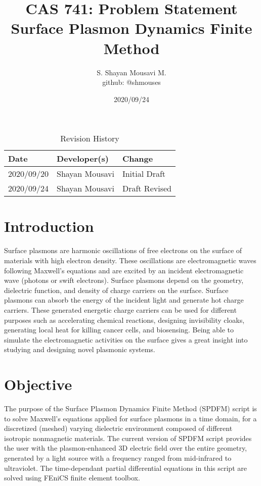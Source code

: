 \documentclass{article} \usepackage{tabularx} \usepackage{booktabs}
\title{CAS 741: Problem Statement\\Surface Plasmon Dynamics Finite Method}
\author{S. Shayan Mousavi M.\\github: @shmouses}
\date{2020/09/24}
\begin{document}
	
	\maketitle \clearpage
	
	
	\begin{table}[hp] \caption{Revision History} \label{TblRevisionHistory}
		\begin{tabularx}{\textwidth}{llX} \toprule \textbf{Date} &
			\textbf{Developer(s)} & \textbf{Change}\\ \midrule 2020/09/20 & Shayan Mousavi
			& Initial Draft\\ 2020/09/24 & Shayan Mousavi & Draft Revised\\ \bottomrule
	\end{tabularx} \end{table}
	
	
	
	\clearpage
	
	
	\newpage
	
	
	\newcommand*\apos{\textsc{\char13}} \section{Introduction}
	
	Surface plasmons are harmonic oscillations of free electrons on the surface of
	materials with high electron density. These oscillations are electromagnetic
	waves following Maxwell's equations and are excited by an incident
	electromagnetic wave (photons or swift electrons). Surface plasmons depend on
	the geometry, dielectric function, and density of charge carriers on the
	surface. Surface plasmons can absorb the energy of the incident light and
	generate hot charge carriers. These generated energetic charge carriers can be
	used for different purposes such as accelerating chemical reactions, designing
	invisibility cloaks, generating local heat for killing cancer cells, and
	biosensing. Being able to simulate the electromagnetic activities on the
	surface gives a great insight into studying and designing novel plasmonic
	systems.
	
	
	\section{Objective}
	
	The purpose of the Surface Plasmon Dynamics Finite Method (SPDFM) script is to
	solve Maxwell's equations applied for surface plasmons in a time domain, for a
	discretized (meshed) varying dielectric environment composed of
	different isotropic nonmagnetic materials. The current version of SPDFM script provides the user with
	the plasmon-enhanced 3D electric field over the entire geometry, generated by a
	light source with a frequency ranged from mid-infrared to ultraviolet. The
	time-dependant partial differential equations in this script are solved using
	FEniCS finite element toolbox.
	
\end{document}
